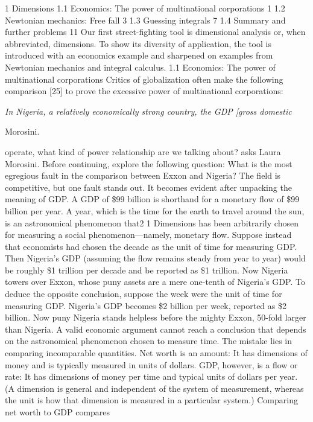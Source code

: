 \documentclass[12pt,a4paper]{article}
\begin{document}
 

1
Dimensions
1.1 Economics: The power of multinational corporations 1
1.2 Newtonian mechanics: Free fall 3
1.3 Guessing integrals 7
1.4 Summary and further problems 11
Our first street-fighting tool is dimensional analysis or, when abbreviated,
dimensions. To show its diversity of application, the tool is introduced
with an economics example and sharpened on examples from Newtonian
mechanics and integral calculus.
1.1 Economics: The power of multinational corporations
Critics of globalization often make the following comparison [25] to prove
the excessive power of multinational corporations:
{\itshape In Nigeria, a relatively economically strong country, the GDP [gross domestic

Morosini.\/}
operate, what kind of power relationship are we talking about?  asks Laura
Morosini.
Before continuing, explore the following question:
What is the most egregious fault in the comparison between Exxon and Nigeria?
The field is competitive, but one fault stands out. It becomes evident after
unpacking the meaning of GDP. A GDP of \$99 billion is shorthand for
a monetary flow of \$99 billion per year. A year, which is the time for
the earth to travel around the sun, is an astronomical phenomenon that2 1 Dimensions
has been arbitrarily chosen for measuring a social phenomenon—namely,
monetary flow.
Suppose instead that economists had chosen the decade as the unit of
time for measuring GDP. Then Nigeria’s GDP (assuming the flow remains
steady from year to year) would be roughly \$1 trillion per decade and
be reported as \$1 trillion. Now Nigeria towers over Exxon, whose puny
assets are a mere one-tenth of Nigeria’s GDP. To deduce the opposite
conclusion, suppose the week were the unit of time for measuring GDP.
Nigeria’s GDP becomes \$2 billion per week, reported as \$2 billion. Now
puny Nigeria stands helpless before the mighty Exxon, 50-fold larger than
Nigeria.
A valid economic argument cannot reach a conclusion that depends on
the astronomical phenomenon chosen to measure time. The mistake lies
in comparing incomparable quantities. Net worth is an amount: It has
dimensions of money and is typically measured in units of dollars. GDP,
however, is a flow or rate: It has dimensions of money per time and
typical units of dollars per year. (A dimension is general and independent
of the system of measurement, whereas the unit is how that dimension is
measured in a particular system.) Comparing net worth to GDP compares
\end{document}
